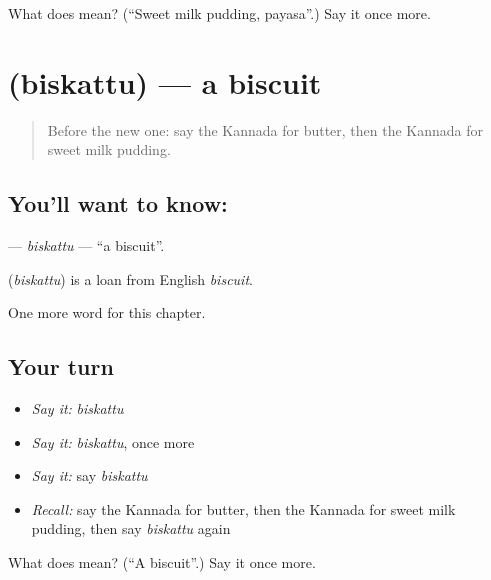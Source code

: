 \begin{tcolorbox}[breakable,colback=teal!4,colframe=teal!35!black,title={Before you move on}]
What does  mean? (\textquotedblleft{}Sweet milk pudding, payasa\textquotedblright{}.) Say it once more.
\end{tcolorbox}
\section[\texorpdfstring{\kn{ಬಿಸ್ಕತ್ತು} (biskattu)}{ಬಿಸ್ಕತ್ತು (biskattu)}]{ (biskattu) — a biscuit}

\label{lesson:KA-C258-biskattu}



\begin{quote}
Before the new one: say the Kannada for butter, then the Kannada for sweet milk pudding.
\end{quote}

\subsection*{You'll want to know: }
\textbf{} — \emph{biskattu} — \textquotedblleft{}a biscuit\textquotedblright{}.

\begin{cousinweb}
\textbf{} (\emph{biskattu}) is a loan from English \emph{biscuit}.
\end{cousinweb}

\begin{grammarlens}[title={What you've built}]
One more word for this chapter.
\end{grammarlens}

\subsection*{Your turn}
\begin{itemize}
\raggedright
  \item \emph{Say it:} \emph{biskattu}
  \item \emph{Say it:} \emph{biskattu}, once more
  \item \emph{Say it:} say \emph{biskattu}
  \item \emph{Recall:} say the Kannada for butter, then the Kannada for sweet milk pudding, then say \emph{biskattu} again
\end{itemize}

\begin{tcolorbox}[breakable,colback=teal!4,colframe=teal!35!black,title={Before you move on}]
What does  mean? (\textquotedblleft{}A biscuit\textquotedblright{}.) Say it once more.
\end{tcolorbox}
